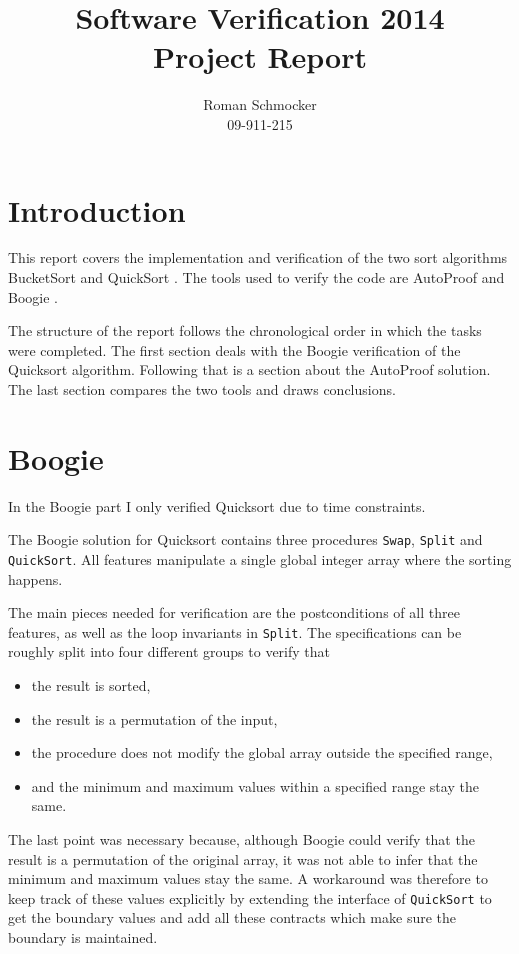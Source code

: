 \documentclass[a4paper,10pt]{article}
\title{Software Verification 2014 \\ Project Report}
\author{Roman Schmocker \\ 09-911-215}
\begin{document}
\maketitle


\section{Introduction}
This report covers the implementation and verification of the two sort algorithms BucketSort \cite{web:bucketsort} and QuickSort \cite{web:quicksort}.
The tools used to verify the code are AutoProof \cite{web:autoproof} and Boogie \cite{paper:boogie, web:boogie}.

The structure of the report follows the chronological order in which the tasks were completed.
The first section deals with the Boogie verification of the Quicksort algorithm.
Following that is a section about the AutoProof solution.
The last section compares the two tools and draws conclusions.

\section {Boogie}

In the Boogie part I only verified Quicksort due to time constraints.

The Boogie solution for Quicksort contains three procedures \lstinline!Swap!, \lstinline!Split! and \lstinline!QuickSort!.
All features manipulate a single global integer array where the sorting happens.

The main pieces needed for verification are the postconditions of all three features, as well as the loop invariants in \lstinline!Split!.
The specifications can be roughly split into four different groups to verify that
\begin{itemize}
 \item the result is sorted, 
 \item the result is a permutation of the input,
 \item the procedure does not modify the global array outside the specified range,
 \item and the minimum and maximum values within a specified range stay the same.
\end{itemize}

The last point was necessary because, although Boogie could verify that the result is a permutation of the original array,
it was not able to infer that the minimum and maximum values stay the same.
A workaround was therefore to keep track of these values explicitly by extending the interface of \lstinline!QuickSort! to get the boundary values
and add all these contracts which make sure the boundary is maintained.
\end{document}
